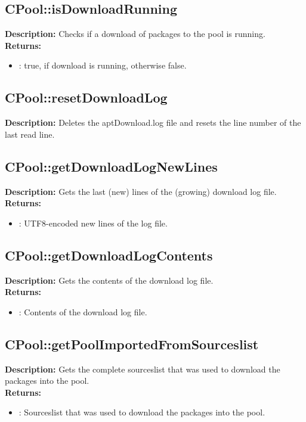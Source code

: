 \subsection{CPool::isDownloadRunning}
\textbf{Description:} Checks if a download of packages to the pool is running.\\
\textbf{Returns:}
\begin{itemize}
\item : true, if download is running, otherwise false.
\end{itemize}

\subsection{CPool::resetDownloadLog}
\textbf{Description:} Deletes the aptDownload.log file and resets the line number of the last read line.\\

\subsection{CPool::getDownloadLogNewLines}
\textbf{Description:} Gets the last (new) lines of the (growing) download log file.\\
\textbf{Returns:}
\begin{itemize}
\item : UTF8-encoded new lines of the log file.
\end{itemize}

\subsection{CPool::getDownloadLogContents}
\textbf{Description:} Gets the contents of the download log file.\\
\textbf{Returns:}
\begin{itemize}
\item : Contents of the download log file.
\end{itemize}

\subsection{CPool::getPoolImportedFromSourceslist}
\textbf{Description:} Gets the complete sourceslist that was used to download the packages into the pool.\\
\textbf{Returns:}
\begin{itemize}
\item : Sourceslist that was used to download the packages into the pool.
\end{itemize}

